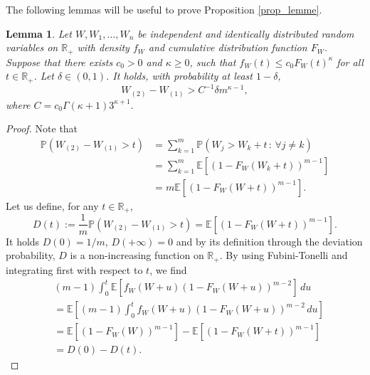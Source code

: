 \documentclass[paper=a4, fontsize=11pt]{scrartcl}
\newcommand{\PP}{\mathbb{P}}
\newtheorem{lemma}[theorem]{Lemma}
\begin{document}
The following lemmas will be useful to prove Proposition \ref{prop_lemme}.

\begin{lemma}\label{kappa}
     Let $W,W_1,\ldots, W_n$ be independent and identically distributed random variables on $\mathbb R_{+}$ with density $f_W$ and cumulative distribution function $F_W$. Suppose that there exists $c_0>0$ and $\kappa \geq 0$, such that  $ f_W (t) \leq c_0 F_W(t) ^{\kappa} $ for all $t\in  \mathbb R_{+} $. 
     Let $\delta \in (0,1) $. It holds, with probability at least $1-\delta $, 
   $$ W_{(2)} -W_{(1)} >    C^{-1} \delta  m^{ \kappa-1 }  ,$$ 
   where $C=  c_0 \Gamma(\kappa+1) 3^{\kappa+1}.$
\end{lemma}


\begin{proof}
    Note that 
\begin{align*}
 \PP (W_{(2)} -W_{(1)}   > t ) &= \sum_{k=1} ^ m \mathbb P (  W_j > W_k + t \, : \, \forall  j \neq k) \\
 &= \sum_{k=1} ^ m \mathbb E [  (1- F_W ( W_k + t ))^{m-1} ]\\
 &= m \mathbb E [   (1- F_W ( W + t ))^{m-1} ].
  \end{align*}
Let us define, 
for any $t\in \mathbb{R}_+$,
\begin{equation*}
    D(t):= \frac{1}{m}\mathbb{P}(W_{(2)}-W_{(1)}>t) =  \mathbb E [   (1- F_W ( W + t ))^{m-1}  ].
\end{equation*}
It holds $D(0)=1/m$, $D(+\infty)=0$ and by its definition through the deviation probability, $D$ is a non-increasing function on $\mathbb{R}_+$. 
By using Fubini-Tonelli and integrating first with respect to $t$, we find
\begin{align*}
    &(m-1)\int_0^t \mathbb{E}[f_W(W+u)(1- F_W ( W + u ))^{m-2}] \, du \\ 
    &= \mathbb E\left[ (m-1)\int_0^t f_W(W+u)(1- F_W ( W + u ))^{m-2} \, du \right] \\ &= \mathbb E [   (1- F_W ( W ))^{m-1}  ] - \mathbb E [   (1- F_W ( W + t ))^{m-1}  ] \\ &= D(0)-D(t).

\end{align*}
\end{proof}
\end{document}

